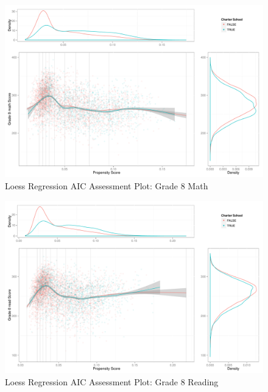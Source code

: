 \begin{figure}[h!]
\begin{center}
\includegraphics[height=.4\textheight]{../Figures2009/g8math-loessAIC.pdf}
\caption{Loess Regression AIC Assessment Plot: Grade 8 Math}
\label{fig:g8math:loess}
\end{center}
\end{figure}

\begin{figure}[h!]
\begin{center}
\includegraphics[height=.4\textheight]{../Figures2009/g8read-loessAIC.pdf}
\caption{Loess Regression AIC Assessment Plot: Grade 8 Reading}
\label{fig:g8read:loess}
\end{center}
\end{figure}


\clearpage
{}

